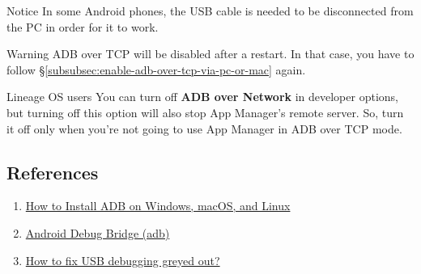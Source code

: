 \begin{tip}{Notice}
    In some Android phones, the USB cable is needed to be disconnected from the PC in order for it to work.
\end{tip}

\begin{warning}{Warning}
    ADB over TCP will be disabled after a restart. In that case, you have to follow
    §\cref{subsubsec:enable-adb-over-tcp-via-pc-or-mac} again.
\end{warning}

\begin{warning}{Lineage OS users}
    You can turn off \textbf{ADB over Network} in developer options, but turning off this option will also stop App
    Manager's remote server. So, turn it off only when you're not going to use App Manager in ADB over TCP mode.
\end{warning}

\subsection{References}\label{subsec:references} %
\begin{enumerate}
    \item \href{https://www.xda-developers.com/install-adb-windows-macos-linux}{How to Install ADB on Windows, macOS, and Linux}
    \item \href{https://developer.android.com/studio/command-line/adb}{Android Debug Bridge (adb)}
    \item \href{https://www.syncios.com/android/fix-usb-debugging-grey-out.html}{How to fix USB debugging greyed out?}
\end{enumerate}
